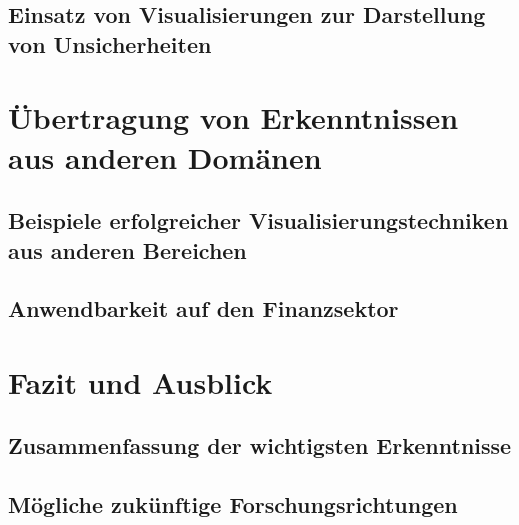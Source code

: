 \subsection{Einsatz von Visualisierungen zur Darstellung von Unsicherheiten}

\section{Übertragung von Erkenntnissen aus anderen Domänen}
\subsection{Beispiele erfolgreicher Visualisierungstechniken aus anderen Bereichen}
\cite{Boller2010}
\subsection{Anwendbarkeit auf den Finanzsektor}

\section{Fazit und Ausblick}
\subsection{Zusammenfassung der wichtigsten Erkenntnisse}
\subsection{Mögliche zukünftige Forschungsrichtungen}

